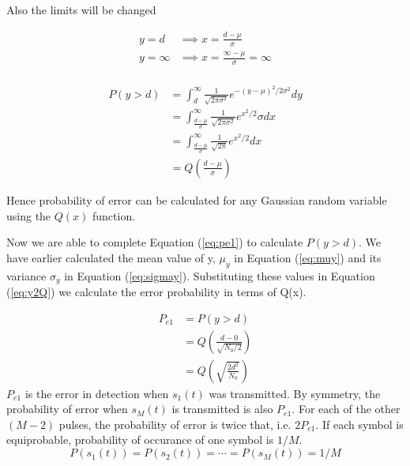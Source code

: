 \documentclass[a4paper]{article}
\numberwithin{equation}{subsection}
\begin{document}
	Also the limits will be changed
	
	\begin{equation}\label{key}
	\begin{aligned}
	y=d &\implies x=\frac{d-\mu}{\sigma}\\
	y=\infty &\implies x=\frac{\infty-\mu}{\sigma}=\infty\\
	\end{aligned}
	\end{equation}
	
	\begin{equation}\label{eq:y2Q}
	\begin{aligned}
	P(y>d)
	&= \int_d^\infty \frac{1}{\sqrt{2\pi \sigma^2}} e^{-(y-\mu)^2/ 2\sigma^2} dy\\
	&= \int_{\frac{d-\mu}{\sigma}}^\infty \frac{1}{\sqrt{2\pi \sigma^2}} e^{x^2/2} \sigma dx\\
	&= \int_{\frac{d-\mu}{\sigma}}^\infty \frac{1}{\sqrt{2\pi}} e^{x^2/2}dx\\
	&=Q(\frac{d-\mu}{\sigma})
	\end{aligned}
	\end{equation}
	
	Hence probability of error can be calculated for any Gaussian random variable using the $Q(x)$ function.
	
	Now we are able to complete Equation (\ref{eq:pe1}) to calculate $P(y>d)$. We have earlier calculated the mean value of y, $\mu_y$ in Equation (\ref{eq:muy}) and its variance $\sigma_y$  in Equation (\ref{eq:sigmay}). Substituting these values in Equation (\ref{eq:y2Q}) we calculate the error probability in terms of Q(x).
	
	\begin{equation}\label{eq:pe1b}
	\begin{aligned}
	P_{e1}
	&=P(y>d)\\
	&=Q(\frac{d-0}{\sqrt{N_0/2}}) \\
	&=Q(\sqrt{\frac{2d^2}{N_0}})
	\end{aligned}
	\end{equation}
%	
%	
%	
	$P_{e1}$ is the error in detection when $s_1(t)$ was transmitted. By symmetry, the probability of error when $s_M(t)$ is transmitted is also $P_{e1}$. For each of the other $(M-2)$ pulses, the probability of error is twice that, i.e. $2P_{e1}$. If each symbol is equiprobable, probability of occurance of one symbol is $1/M$. 
	\begin{equation}\label{key}
	P(s_1(t))=P(s_2(t))=\cdots=P(s_M(t))=1/M
	\end{equation}
	
\end{document}
